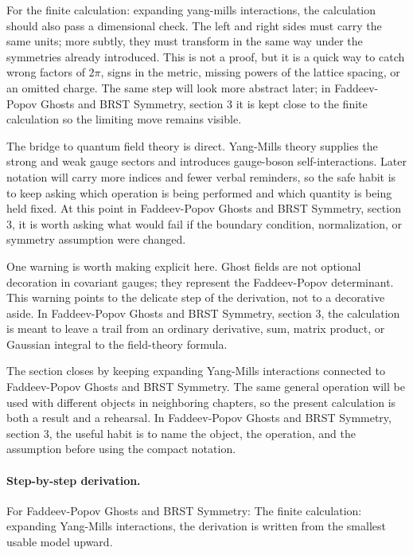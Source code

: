 For the finite calculation: expanding yang-mills interactions, the calculation should also pass a dimensional check.  The left and right sides must carry the same units; more subtly, they must transform in the same way under the symmetries already introduced.  This is not a proof, but it is a quick way to catch wrong factors of \(2\pi\), signs in the metric, missing powers of the lattice spacing, or an omitted charge.  The same step will look more abstract later; in Faddeev-Popov Ghosts and BRST Symmetry, section 3 it is kept close to the finite calculation so the limiting move remains visible.

The bridge to quantum field theory is direct.  Yang-Mills theory supplies the strong and weak gauge sectors and introduces gauge-boson self-interactions.  Later notation will carry more indices and fewer verbal reminders, so the safe habit is to keep asking which operation is being performed and which quantity is being held fixed.  At this point in Faddeev-Popov Ghosts and BRST Symmetry, section 3, it is worth asking what would fail if the boundary condition, normalization, or symmetry assumption were changed.

One warning is worth making explicit here.  Ghost fields are not optional decoration in covariant gauges; they represent the Faddeev-Popov determinant.  This warning points to the delicate step of the derivation, not to a decorative aside.  In Faddeev-Popov Ghosts and BRST Symmetry, section 3, the calculation is meant to leave a trail from an ordinary derivative, sum, matrix product, or Gaussian integral to the field-theory formula.

The section closes by keeping expanding Yang-Mills interactions connected to Faddeev-Popov Ghosts and BRST Symmetry.  The same general operation will be used with different objects in neighboring chapters, so the present calculation is both a result and a rehearsal.  In Faddeev-Popov Ghosts and BRST Symmetry, section 3, the useful habit is to name the object, the operation, and the assumption before using the compact notation.



\paragraph{Step-by-step derivation.}

For Faddeev-Popov Ghosts and BRST Symmetry: The finite calculation: expanding Yang-Mills interactions, the derivation is written from the smallest usable model upward.

